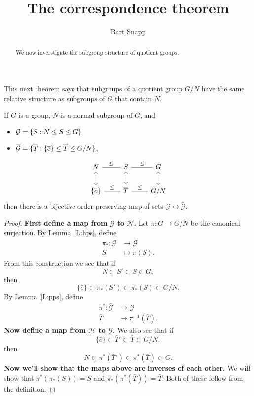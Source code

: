 \documentclass{ximera}
\author{Bart Snapp}
\title{The correspondence theorem}
\begin{document}
\begin{abstract}
  We now inverstigate the subgroup structure of quotient groups.
\end{abstract}
\maketitle

This next theorem says that subgroups of a quotient group $G/N$ have
the same relative structure as subgroups of $G$ that contain $N$.

\begin{theorem}
  If $G$ is a group, $N$ is a normal subgroup of $G$, and
  \begin{itemize}
  \item $\mathcal{G} = \{S:N\leq S\leq G\}$
  \item $\mathcal{\overline{G}} = \{\overline{T}:\{\overline{e}\}\leq \overline{T}\leq G/N\}$,
  \end{itemize}
  \[
  \begin{tikzcd}
    N \ar[r,-,"\subgp"] \ar[d,<->,dotted]& S\ar[r,-,"\subgp"] \ar[d,<->,dotted]& G \ar[d,<->,dotted]\\
    \{\bar{e}\} \ar[r,-,"\subgp"] & \bar{T} \ar[r,-,"\subgp"] & G/N
  \end{tikzcd}
  \]
  then there is a bijective order-preserving map of sets
  $\mathcal{G}\leftrightarrow\mathcal{\bar{G}}$.
  \begin{proof}
    \textbf{First define a map from $\pmb{\mathcal{G}}$ to
      $\pmb{\mathcal{N}}$.} Let $\pi:G\to G/N$ be the canonical
    surjection.  By Lemma~\ref{L:hps}, define
    \begin{align*}
    \pi_*:\mathcal{G} &\to \bar{\mathcal{G}}\\
    S &\mapsto \pi(S).
    \end{align*}
    From this construction we see that if
    \[
    N \subset S'\subset S \subset G,
    \]
    then
    \[
    \{\bar{e}\}\subset \pi_*(S') \subset \pi_*(S)\subset G/N.
    \]
    By Lemma~\ref{L:pps}, define
    \begin{align*}
    \pi^*:\bar{\mathcal{G}} &\to \mathcal G\\ \bar{T} &\mapsto
    \pi^{-1}(\bar{T}).
    \end{align*}
    \textbf{Now define a map from $\pmb{\mathcal{H}}$ to
      $\pmb{\mathcal{G}}$.}  We also see that if
    \[
    \{\bar{e}\} \subset \bar{T}\hspace{0em}' \subset \bar{T} \subset G/N,
    \]
    then
    \[
    N \subset \pi^*(\bar{T}\hspace{0em}')\subset \pi^*(\bar{T}) \subset G.
    \]
    \textbf{Now we'll show that the maps above are inverses of each
      other.} We will show that $\pi^*(\pi_*(S)) = S$ and
    $\pi_*(\pi^*(\bar T)) = \bar{T}$. Both of these follow from the
    definition.
  \end{proof}
\end{theorem}
\end{document}
